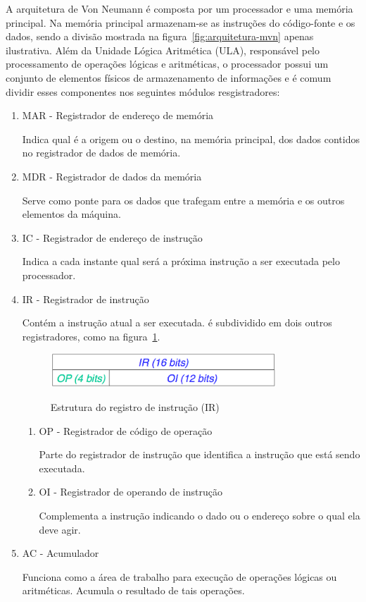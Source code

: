 A arquitetura de Von Neumann é composta por um processador e uma memória principal. Na memória principal armazenam-se as instruções do código-fonte e os dados, sendo a divisão mostrada na figura~\ref{fig:arquitetura-mvn} apenas ilustrativa. Além da Unidade Lógica Aritmética (ULA), responsável pelo processamento de operações lógicas e aritméticas, o processador possui um conjunto de elementos físicos de armazenamento de informações e é comum dividir esses componentes nos seguintes módulos resgistradores:

\begin{enumerate}
	\item MAR - Registrador de endereço de memória
	
	Indica qual é a origem ou o destino, na memória principal, dos dados contidos no registrador de dados de memória.
	
	\item MDR -  Registrador de dados da memória
	
	Serve como ponte para os dados que trafegam entre a memória e os outros elementos da máquina.

	\item IC - Registrador de endereço de instrução 

	Indica a cada instante qual será a próxima instrução a ser executada pelo processador.

	\item IR -  Registrador de instrução

	Contém a instrução atual a ser executada. é subdividido em dois outros registradores, como na figura~\ref{fig:estrutura-ir}.
	\begin{figure}[ht]
		\centering
		\caption{Estrutura do registro de instrução (IR)}
		\includegraphics[width=0.8\textwidth]{images/estrutura-ir.png}
		\label{fig:estrutura-ir}
	\end{figure}

	\begin{enumerate}
		\item OP - Registrador de código de operação

		Parte do registrador de instrução que identifica a instrução que está sendo executada.

		\item OI - Registrador de operando de instrução

		Complementa a instrução indicando o dado ou o endereço sobre o qual ela deve agir.
	\end{enumerate}

	\item AC - Acumulador 

	Funciona como a área de trabalho para execução de operações lógicas ou aritméticas. Acumula o resultado de tais operações.
\end{enumerate}

